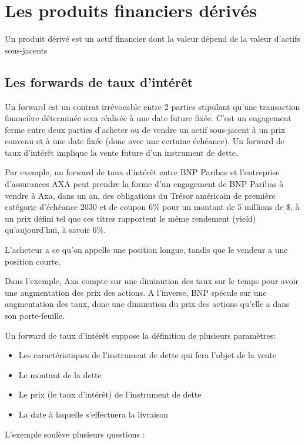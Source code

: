 \chapter{Les produits financiers dérivés}

Un produit dérivé est un actif financier dont la valeur dépend de la valeur d'actifs sous-jacents

\section{Les forwards de taux d'intérêt}

Un forward est un contrat irrévocable entre 2 parties stipulant qu'une transaction financière déterminée sera réalisée à une date future fixée. C'est un engagement ferme entre deux parties d'acheter ou de vendre un actif sous-jacent à un prix convenu et à une date fixée (donc avec une certaine échéance). Un forward de taux d'intérêt implique la vente future d'un instrument de dette.

Par exemple, un forward de taux d'intérêt entre BNP Paribas et l'entreprise d'assurances AXA peut prendre la forme d’un engagement de BNP Paribas à vendre à Axa, dans un an, des obligations du Trésor américain de première catégorie d'échéance 2030 et de coupon 6\% pour un montant de 5 millions de \$, à un prix défini tel que ces titres rapportent le même rendement (yield) qu’aujourd'hui, à savoir 6\%. 

L'acheteur a ce qu'on appelle une position longue, tandis que le vendeur a une position courte.

Dans l'exemple, Axa compte sur une diminution des taux sur le temps pour avoir une augmentation des prix des actions. A l'inverse, BNP spécule sur une augmentation des taux, donc une diminution du prix des actions qu'elle a dans son porte-feuille.

Un forward de taux d'intérêt suppose la définition de plusieurs paramètres: 
\begin{itemize}
	\item Les caractéristiques de l'instrument de dette qui fera l'objet de la vente 
	\item Le montant de la dette 
	\item Le prix (le taux d'intérêt) de l'instrument de dette 
	\item La date à laquelle s'effectuera la livraison
\end{itemize}

L'exemple soulève plusieurs questions :


